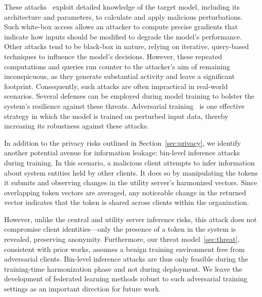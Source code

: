  These attacks~\cite{chakraborty2021survey} exploit detailed knowledge of the target model, including its architecture and parameters, to calculate and apply malicious perturbations. Such white-box access allows an attacker to compute precise gradients that indicate how inputs should be modified to degrade the model’s performance. Other attacks tend to be black-box in nature, relying on iterative, query-based techniques to influence the model’s decisions. However, these repeated computations and queries run counter to the attacker’s aim of remaining inconspicuous, as they generate substantial activity and leave a significant footprint. Consequently, such attacks are often impractical in real-world scenarios. Several defenses can be employed during model training to bolster the system’s resilience against these threats. Adversarial training~\cite{tramer2019adversarial} is one effective strategy in which the model is trained on perturbed input data, thereby increasing its robustness against these attacks.

In addition to the privacy risks outlined in Section~\ref{sec:privacy}, we identify another potential avenue for information leakage: bin-level inference attacks during training. In this scenario, a malicious client attempts to infer information about system entities held by other clients. It does so by manipulating the tokens it submits and observing changes in the utility server's harmonized vectors. Since overlapping token vectors are averaged, any noticeable change in the returned vector indicates that the token is shared across clients within the organization.  

However, unlike the central and utility server inference risks, this attack does not compromise client identities—only the presence of a token in the system is revealed, preserving anonymity. Furthermore, our threat model~\ref{sec:threat}, consistent with prior \pids works, assumes a benign training environment free from adversarial clients. Bin-level inference attacks are thus only feasible during the training-time harmonization phase and not during deployment. We leave the development of federated learning methods robust to such adversarial training settings as an important direction for future work.
